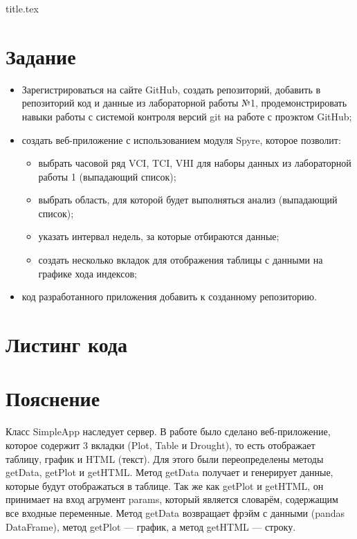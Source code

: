




{title.tex}

\clearpage



\clearpage
{}
\pagestyle{fancy}
\setcounter{page}{2}

\clearpage

\chapter{Задание}
\begin{itemize}
\item Зарегистрироваться на сайте GitHub, создать репозиторий, добавить в репозиторий код и данные из лабораторной работы №1, продемонстрировать навыки работы с системой контроля версий git на работе с проэктом GitHub;
\item создать веб-приложение с использованием модуля Spyre, которое позволит:
\begin{itemize}
\item выбрать часовой ряд VCI, TCI, VHI для наборы данных из лабораторной работы 1 (выпадающий список);
\item выбрать область, для которой будет выполняться анализ (выпадающий список);
\item указать интервал недель, за которые отбираются данные;
\item создать несколько вкладок для отображения таблицы с данными на графике хода индексов;
\end{itemize}
\item код разработанного приложения добавить к созданному репозиторию.
\end{itemize}

\chapter{Листинг кода}
\lstset{inputencoding=utf8, extendedchars=\true}


\chapter{Пояснение}
Класс SimpleApp наследует сервер. В работе было сделано веб-приложение, которое содержит 3 вкладки (Plot, Table и Drought), то есть отображает таблицу, график и HTML (текст). Для этого были переопределены методы getData, getPlot и getHTML. Метод getData получает и генерирует данные, которые будут отображаться в таблице. Так же как getPlot и getHTML, он принимает на вход агрумент params, который является словарём, содержащим все входные переменные. Метод getData возвращает фрэйм с данными (pandas DataFrame), метод getPlot --- график, а метод getHTML --- строку.

